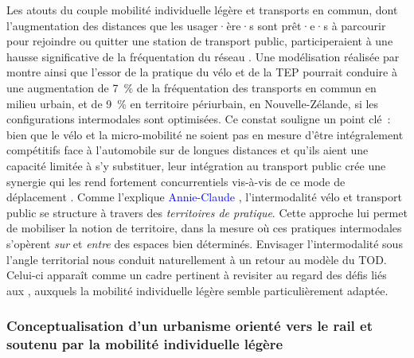 \begin{refsegment}
Les atouts du couple mobilité individuelle légère et transports en commun, dont l’augmentation des distances que les usager·ère·s sont prêt·e·s à parcourir pour rejoindre ou quitter une station de transport public, participeraient à une hausse significative de la fréquentation du réseau \textcolor{blue}{\autocite[]{wang_approximating_2016}}. Une modélisation réalisée par \textcolor{blue}{\textcite[69]{ensor_mode_2021}} montre ainsi que l’essor de la pratique du vélo et de la \acrshort{TEP} pourrait conduire à une augmentation de 7~\% de la fréquentation des transports en commun en milieu urbain, et de 9~\% en territoire \gls{périurbain}, en Nouvelle-Zélande, si les configurations intermodales sont optimisées. Ce constat souligne un point clé~: bien que le vélo et la micro-mobilité ne soient pas en mesure d’être intégralement compétitifs face à l’automobile sur de longues distances et qu’ils aient une capacité limitée à s’y substituer, leur intégration au transport public crée une synergie qui les rend fortement concurrentiels vis-à-vis de ce mode de déplacement \textcolor{blue}{\autocite[43]{corporate_partnership_board_good_2020}}. Comme l’explique \textcolor{blue}{Annie-Claude} \textcolor{blue}{\textcite[262]{sebban_complementarite_2003}}, l’intermodalité vélo et transport public se structure à travers des \textsl{territoires de pratique}. Cette approche lui permet de mobiliser la notion de territoire, dans la mesure où ces pratiques intermodales s’opèrent \textsl{sur} et \textsl{entre} des espaces bien déterminés. Envisager l’intermodalité sous l’angle territorial nous conduit naturellement à un retour au modèle du \acrshort{TOD}. Celui-ci apparaît comme un cadre pertinent à revisiter au regard des défis liés aux , auxquels la mobilité individuelle légère semble particulièrement adaptée.%

\subsubsection*{Conceptualisation d'un urbanisme orienté vers le rail et soutenu par la mobilité individuelle légère
    \label{chap1:btod-m-tod}
    }


\end{refsegment}

